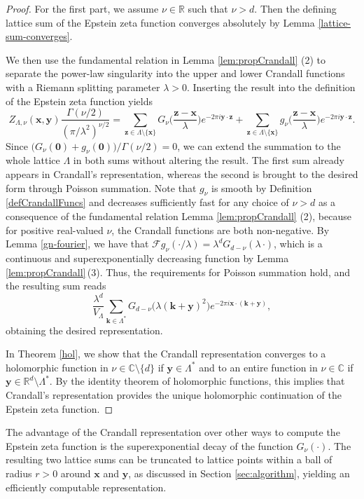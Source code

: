 \documentclass[]{amsart}
\newcommand{\new}[1]{#1}
\newcommand{\zeps}[3]{\new{Z_{#1} (#2, #3)}}
\numberwithin{mythm}{section}
\begin{document}
\begin{proof}
For the first part, we assume $\nu \in \mathds{R}$ such that $\nu > d$. Then the defining lattice sum of the Epstein zeta function converges absolutely by  
Lemma \ref{lattice-sum-converges}.

We then use the fundamental relation 
 in 
 Lemma \ref{lem:propCrandall} (2) to separate the power-law singularity into the upper and lower Crandall functions
with a Riemann splitting parameter $\lambda>0$.
Inserting the result into the definition of the Epstein zeta function yields
\[\zeps{\Lambda,\nu}{\bm x}{\bm y} \frac{\Gamma(\nu/2)}{(\pi/\lambda^2)^{\nu/2}}
= \sum_{\bm z \in \Lambda\setminus\{\bm x\}} G_\nu\Big(\frac{\bm{z}-\bm{x}}{\lambda}\Big) e^{-2\pi i \bm y \cdot\bm z}+\sum_{\bm z \in \Lambda\setminus\{\bm x\}} g_\nu\Big(\frac{\bm{z}-\bm{x}}{\lambda}\Big) e^{-2\pi i \bm y \cdot\bm z} .
\]
Since \(\big(G_{\nu}(\bm 0)+g_{\nu}(\bm 0)\big)/\Gamma(\nu/2)=0\), we can extend the summation to the whole lattice $\Lambda$ in both sums without altering the result. The first sum already appears in Crandall's representation, whereas the second is brought to the desired form through Poisson summation.  
Note that $g_{\nu}$ is smooth by 
Definition \ref{defCrandallFuncs} and decreases sufficiently fast for any choice of $\nu>d$ as a consequence of the fundamental relation 
Lemma \ref{lem:propCrandall} (2), because for positive real-valued $\nu$, the Crandall functions are both non-negative. By 
Lemma \ref{gn-fourier}, we have that  $\mathcal F g_{\nu}(\bm \cdot/\lambda) = \lambda^d G_{d-\nu}(\lambda \,\bm \cdot)$, which is a continuous and superexponentially decreasing function by 
Lemma \ref{lem:propCrandall}\,(3). Thus, the requirements for 
Poisson summation hold, and the resulting sum reads
\[\frac{\lambda^d}{V_\Lambda} \sum_{\bm k \in \Lambda^*} G_{d-\nu}\bigl(\lambda(\bm k + \bm y)^2 \bigr) e^{-2\pi  i  \bm x \cdot (\bm k + \bm y)},\]
obtaining the desired representation.

In Theorem \ref{hol}, we show that the Crandall representation converges to a holomorphic function in $\nu \in \mathds{C} \setminus \{d\}$ if $\bm y \in \Lambda^*$ and to an entire function in $\nu \in \mathds{C}$ if \(\bm y\in\mathds R^d\setminus\Lambda^*\). 
By the identity theorem of holomorphic functions, this implies that Crandall's representation provides the unique holomorphic continuation of the Epstein zeta function.
\end{proof}


The advantage of the Crandall representation over other ways to compute the
 Epstein zeta function is the superexponential decay of the function $G_{\nu}(\bm \cdot)$. The
 resulting two lattice sums can be truncated to lattice points within a ball of radius
 $r >0$ around $\bm x$ and $\bm y$, as discussed in Section \ref{sec:algorithm}, yielding an efficiently computable
 representation.
\end{document}
